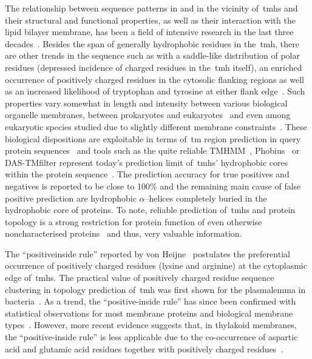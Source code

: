 The relationship between sequence patterns in and in the vicinity of~\gls{tmh}s and their structural and functional properties, as well as their interaction with the lipid bilayer membrane, has been a field of intensive research in the last three decades~\cite{Ladokhin2015}.
Besides the span of generally hydrophobic residues in the~\gls{tmh}, there are other trends in the sequence such as with a saddle-like distribution of polar residues (depressed incidence of charged residues in the~\gls{tmh}  itself), an enriched occurrence of positively charged residues in the cytosolic flanking regions as well as an increased likelihood of tryptophan and tyrosine at either flank edge~\cite{Sharpe2010, VonHeijne1986,VonHeijne1988,VonHeijne1989, Baeza-Delgado2013, Granseth2005}.
Such properties vary somewhat in length and intensity between various biological organelle membranes, between prokaryotes and eukaryotes~\cite{Ojemalm2013} and even among eukaryotic species studied due to slightly different membrane constraints~\cite{Sharpe2010, Pogozheva2013}.
These biological dispositions are exploitable in terms of~\gls{tm} region prediction in query protein sequences~\cite{Beuming2004, Zhao2006} and tools such as the quite reliable TMHMM~\cite{Krogh2001,Sonnhammer1998}, Phobius~\cite{Kall2004, Kall2007} or DAS-TMfilter represent today’s prediction limit of~\gls{tmh}s’ hydrophobic cores within the protein sequence~\cite{Cserzo2002, Cserzo2004, Kall2002}.
The prediction accuracy for true positives and negatives is reported to be close to 100\% and the remaining main cause of false positive prediction are hydrophobic \(\alpha\)--helices completely buried in the hydrophobic core of proteins.
 To note, reliable prediction of~\gls{tmh}s and protein topology is a strong restriction for protein function of even otherwise non\-characterised proteins~\cite{Eisenhaber2016, Eisenhaber2012, Sherman2015} and thus, very valuable information.

The ``positive\-inside rule'' reported by von Heijne~\cite{VonHeijne2006,VonHeijne1989} postulates the preferential occurrence of positively charged residues (lysine and arginine) at the cytoplasmic edge of~\gls{tmh}s.
The practical value of positively charged residue sequence clustering in topology prediction of~\gls{tmh} was first shown for the plasmalemma in bacteria~\cite{VonHeijne1989, Sipos1993}.
As a trend, the ``positive-inside rule'' has since been confirmed with statistical observations for most membrane proteins and biological membrane types~\cite{Baeza-Delgado2013, Gavel1991, Nilsson2005a, Wallin1998}.
However, more recent evidence suggests that, in thylakoid membranes, the ``positive-inside rule'' is less applicable due to the co-occurrence of aspartic acid and glutamic acid residues together with positively charged residues~\cite{Pogozheva2013}.

